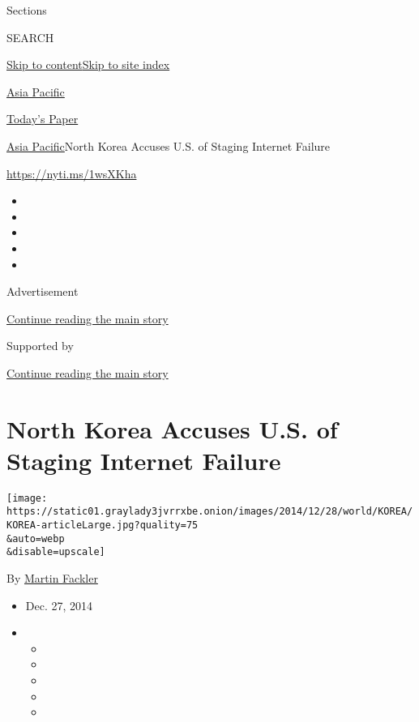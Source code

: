 Sections

SEARCH

\protect\hyperlink{site-content}{Skip to
content}\protect\hyperlink{site-index}{Skip to site index}

\href{https://www.nytimes3xbfgragh.onion/section/world/asia}{Asia
Pacific}

\href{https://myaccount.nytimes3xbfgragh.onion/auth/login?response_type=cookie\&client_id=vi}{}

\href{https://www.nytimes3xbfgragh.onion/section/todayspaper}{Today's
Paper}

\href{/section/world/asia}{Asia Pacific}\textbar{}North Korea Accuses
U.S. of Staging Internet Failure

\url{https://nyti.ms/1wsXKha}

\begin{itemize}
\item
\item
\item
\item
\item
\end{itemize}

Advertisement

\protect\hyperlink{after-top}{Continue reading the main story}

Supported by

\protect\hyperlink{after-sponsor}{Continue reading the main story}

\hypertarget{north-korea-accuses-us-of-staging-internet-failure}{%
\section{North Korea Accuses U.S. of Staging Internet
Failure}\label{north-korea-accuses-us-of-staging-internet-failure}}

\texttt{[image: https://static01.graylady3jvrrxbe.onion/images/2014/12/28/world/KOREA/KOREA-articleLarge.jpg?quality=75\\\&auto=webp\\\&disable=upscale]}

By \href{http://www.nytimes3xbfgragh.onion/by/martin-fackler}{Martin
Fackler}

\begin{itemize}
\item
  Dec. 27, 2014
\item
  \begin{itemize}
  \item
  \item
  \item
  \item
  \item
  \end{itemize}
\end{itemize}


